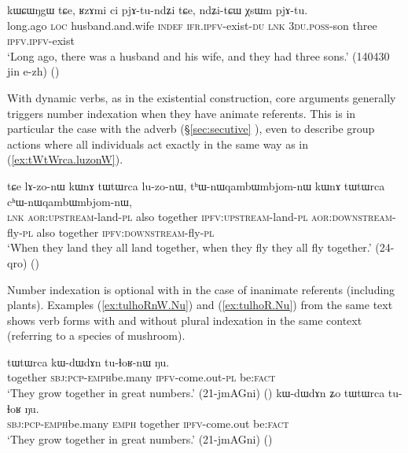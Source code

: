 \begin{exe}
\ex \label{ex:pjAtundZi.pjAtu}
\gll kɯɕɯŋgɯ tɕe, ʁzɤmi ci pjɤ-tu-ndʑi tɕe, ndʑi-tɕɯ χsɯm pjɤ-tu. \\
long.ago \textsc{loc} husband.and.wife \textsc{indef} \textsc{ifr}.\textsc{ipfv}-exist-\textsc{du} \textsc{lnk} \textsc{3du}.\textsc{poss}-son three \textsc{ipfv}.\textsc{ipfv}-exist \\
\glt `Long ago, there was a husband and his wife, and they had three sons.' (140430 jin e-zh)
()
\end{exe}

With dynamic verbs, as in the existential construction, core arguments generally triggers number indexation when they have animate referents. This is in particular the case with the adverb  (§\ref{sec:secutive} ), even to describe group actions where all individuals act exactly in the same way as in (\ref{ex:tWtWrca.luzonW}).

\begin{exe}
\ex \label{ex:tWtWrca.luzonW}
\gll tɕe lɤ-zo-nɯ kɯnɤ tɯtɯrca lu-zo-nɯ, tʰɯ-nɯqambɯmbjom-nɯ kɯnɤ tɯtɯrca cʰɯ-nɯqambɯmbjom-nɯ, \\
\textsc{lnk} \textsc{aor}:\textsc{upstream}-land-\textsc{pl}  also  together  \textsc{ipfv}:\textsc{upstream}-land-\textsc{pl} \textsc{aor}:\textsc{downstream}-fly-\textsc{pl}  also together  \textsc{ipfv}:\textsc{downstream}-fly-\textsc{pl} \\
\glt `When they land they all land together, when they fly they all fly together.' (24-qro)
()
\end{exe}

Number indexation is optional with  in the case of inanimate referents (including plants). Examples (\ref{ex:tulhoRnW.Nu}) and (\ref{ex:tulhoR.Nu}) from the same text shows verb forms with and without plural indexation in the same context (referring to a species of mushroom).

\begin{exe}
\ex 
\begin{xlist}
\ex \label{ex:tulhoRnW.Nu}
\gll tɯtɯrca kɯ-dɯ\redp{}dɤn tu-ɬoʁ-nɯ ŋu. \\
together \textsc{sbj}:\textsc{pcp}-\textsc{emph}\redp{}be.many \textsc{ipfv}-come.out-\textsc{pl} be:\textsc{fact} \\
\glt `They grow together in great numbers.' (21-jmAGni) ()
\ex \label{ex:tulhoR.Nu}
\gll kɯ-dɯ\redp{}dɤn ʑo tɯtɯrca tu-ɬoʁ ŋu. \\
 \textsc{sbj}:\textsc{pcp}-\textsc{emph}\redp{}be.many \textsc{emph} together \textsc{ipfv}-come.out be:\textsc{fact} \\
\glt `They grow together in great numbers.'  (21-jmAGni) 	()
\end{xlist}
\end{exe}

